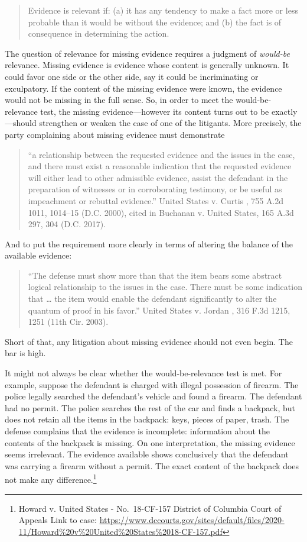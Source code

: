 \documentclass[
  10pt,
  dvipsnames,enabledeprecatedfontcommands]{scrartcl}
\begin{document}
\begin{quote}
Evidence is relevant if: (a) it has any tendency to make a fact more or less probable than it would be without the evidence; and (b) the fact is of consequence in determining the action.
\end{quote}

\noindent The question of relevance for missing evidence requires a
judgment of \textit{would-be} relevance. Missing evidence is evidence
whose content is generally unknown. It could favor one side or the other
side, say it could be incriminating or exculpatory. If the content of
the missing evidence were known, the evidence would not be missing in
the full sense. So, in order to meet the would-be-relevance test, the
missing evidence---however its content turns out to be exactly---should
strengthen or weaken the case of one of the litigants. More precisely,
the party complaining about missing evidence must demonstrate

\begin{quote}
``a relationship between the requested evidence and the issues in the
case, and there must exist a reasonable indication that the requested
evidence will either lead to other admissible evidence, assist the
defendant in the preparation of witnesses or in corroborating testimony,
or be useful as impeachment or rebuttal evidence.'' United States v.
Curtis , 755 A.2d 1011, 1014--15 (D.C. 2000), cited in Buchanan v.
United States, 165 A.3d 297, 304 (D.C. 2017).
\end{quote}

\noindent And to put the requirement more clearly in terms of altering
the balance of the available evidence:

\begin{quote}
``The defense must show more than that the item bears some abstract
logical relationship to the issues in the case. There must be some
indication that \ldots{} the item would enable the defendant
significantly to alter the quantum of proof in his favor.'' United
States v. Jordan , 316 F.3d 1215, 1251 (11th Cir. 2003).
\end{quote}

\noindent Short of that, any litigation about missing evidence should
not even begin. The bar is high.

It might not always be clear whether the would-be-relevance test is met.
For example, suppose the defendant is charged with illegal possession of
firearm. The police legally searched the defendant's vehicle and found a
firearm. The defendant had no permit. The police searches the rest of
the car and finds a backpack, but does not retain all the items in the
backpack: keys, pieces of paper, trash. The defense complains that the
evidence is incomplete: information about the contents of the backpack
is missing. On one interpretation, the missing evidence seems
irrelevant. The evidence available shows conclusively that the defendant
was carrying a firearm without a permit. The exact content of the
backpack does not make any difference.\footnote{Howard v. United States
  - No.~18-CF-157 District of Columbia Court of Appeals Link to case:
  \url{https://www.dccourts.gov/sites/default/files/2020-11/Howard\%20v\%20United\%20States\%2018-CF-157.pdf}}
\end{document}
